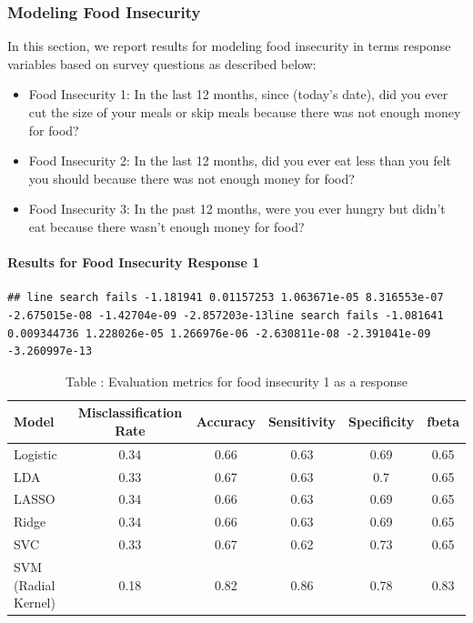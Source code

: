 \documentclass[
  10pt,
]{article}
\begin{document}
\hypertarget{modeling-food-insecurity}{%
\subsubsection{Modeling Food Insecurity}\label{modeling-food-insecurity}}

In this section, we report results for modeling food insecurity in terms response variables based on survey questions as described below:

\begin{itemize}
\item
  Food Insecurity 1: In the last 12 months, since (today's date), did you ever cut the size of your meals or skip meals because there was not enough money for food?
\item
  Food Insecurity 2: In the last 12 months, did you ever eat less than you felt you should because there was not enough money for food?
\item
  Food Insecurity 3: In the past 12 months, were you ever hungry but didn't eat because there wasn't enough money for food?
\end{itemize}

\hypertarget{results-for-food-insecurity-response-1}{%
\paragraph{Results for Food Insecurity Response 1}\label{results-for-food-insecurity-response-1}}

\begin{verbatim}
## line search fails -1.181941 0.01157253 1.063671e-05 8.316553e-07 -2.675015e-08 -1.42704e-09 -2.857203e-13line search fails -1.081641 0.009344736 1.228026e-05 1.266976e-06 -2.630811e-08 -2.391041e-09 -3.260997e-13
\end{verbatim}

\begin{table}[H]

\caption{\label{tab:unnamed-chunk-11}Table : Evaluation metrics for  food insecurity 1 as a response}
\centering
\fontsize{12}{14}\selectfont
\begin{tabular}[t]{l|c|c|c|c|c}
\hline
Model & Misclassification Rate & Accuracy & Sensitivity & Specificity & fbeta\\
\hline
Logistic & 0.34 & 0.66 & 0.63 & 0.69 & 0.65\\
\hline
LDA & 0.33 & 0.67 & 0.63 & 0.7 & 0.65\\
\hline
LASSO & 0.34 & 0.66 & 0.63 & 0.69 & 0.65\\
\hline
Ridge & 0.34 & 0.66 & 0.63 & 0.69 & 0.65\\
\hline
SVC & 0.33 & 0.67 & 0.62 & 0.73 & 0.65\\
\hline
SVM (Radial Kernel) & 0.18 & 0.82 & 0.86 & 0.78 & 0.83\\
\hline
\end{tabular}
\end{table}
\end{document}
